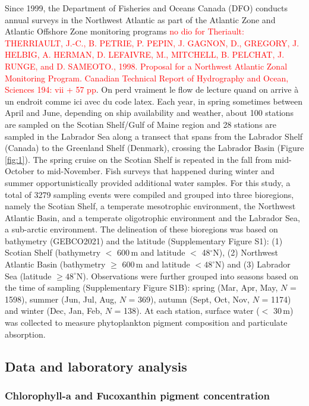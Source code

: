 \documentclass[utf8]{frontiersSCNS} %
\begin{document}
Since 1999, the Department of Fisheries and Oceans Canada (DFO) conducts annual surveys in the Northwest Atlantic as part of the Atlantic Zone and Atlantic Offshore Zone monitoring programs \cite{therriault1998,Pepin2005} \textcolor{red}{no dio for Theriault: THERRIAULT, J.-C., B. PETRIE, P. PEPIN, J. GAGNON, D., GREGORY, J. HELBIG, A. HERMAN, D. LEFAIVRE, M., MITCHELL, B. PELCHAT, J. RUNGE, and D. SAMEOTO., 1998. Proposal for a Northwest Atlantic Zonal Monitoring Program. Canadian Technical Report of Hydrography and Ocean, Sciences 194: vii + 57 pp}. On perd vraiment le flow de lecture quand on arrive à un endroit comme ici avec du code latex. Each year, in spring sometimes between April and June, depending on ship availability and weather, about 100 stations are sampled on the Scotian Shelf/Gulf of Maine region and 28 stations are sampled in the Labrador Sea along a transect that spans from the Labrador Shelf (Canada) to the Greenland Shelf (Denmark), crossing the Labrador Basin (Figure \ref{fig:1}). The spring cruise on the Scotian Shelf is repeated in the fall from mid-October to mid-November. Fish surveys that happened during winter and summer opportunistically provided additional water samples. For this study, a total of 3279 sampling events were compiled and grouped into three bioregions, namely the Scotian Shelf, a temperate mesotrophic environment, the Northwest Atlantic Basin, and a temperate oligotrophic environment and the Labrador Sea, a sub-arctic environment. The delineation of these bioregions was based on bathymetry (GEBCO2021) and the latitude (Supplementary Figure S1): (1) Scotian Shelf (bathymetry $<$ 600\,m and latitude $<$ 48$^\circ$N), (2) Northwest Atlantic Basin (bathymetry $\ge$ 600\,m and latitude $< 48^\circ$N) and (3) Labrador Sea (latitude $\geq 48^\circ$N). Observations were further grouped into seasons based on the time of sampling (Supplementary Figure S1B): spring (Mar, Apr, May, $N$ = 1598), summer (Jun, Jul, Aug, $N$ = 369), autumn (Sept, Oct, Nov, $N$ = 1174) and winter (Dec, Jan, Feb, $N$ = 138). At each station, surface water ($<$ 30\,m) was collected to measure phytoplankton pigment composition and particulate absorption.

\subsection{Data and laboratory analysis}

\subsubsection{Chlorophyll-a and Fucoxanthin pigment concentration}
\end{document}
